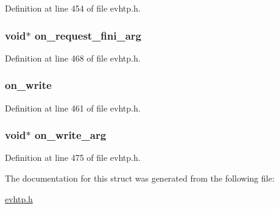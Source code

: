 \-Definition at line 454 of file evhtp.\-h.

\hypertarget{structevhtp__hooks__s_a6ff6528fe6d2018c55a718ca829e00be}{
\subsubsection[{on\-\_\-request\-\_\-fini\-\_\-arg}]{\setlength{\rightskip}{0pt plus 5cm}void$\ast$ {\bf on\-\_\-request\-\_\-fini\-\_\-arg}}}\label{structevhtp__hooks__s_a6ff6528fe6d2018c55a718ca829e00be}


\-Definition at line 468 of file evhtp.\-h.

\hypertarget{structevhtp__hooks__s_a1f9dee4096564721214ecfe05707510a}{
\subsubsection[{on\-\_\-write}]{ {\bf on\-\_\-write}}}\label{structevhtp__hooks__s_a1f9dee4096564721214ecfe05707510a}


\-Definition at line 461 of file evhtp.\-h.

\hypertarget{structevhtp__hooks__s_a9aa579b8a735219a73e5e37c390a9580}{
\subsubsection[{on\-\_\-write\-\_\-arg}]{\setlength{\rightskip}{0pt plus 5cm}void$\ast$ {\bf on\-\_\-write\-\_\-arg}}}\label{structevhtp__hooks__s_a9aa579b8a735219a73e5e37c390a9580}


\-Definition at line 475 of file evhtp.\-h.



\-The documentation for this struct was generated from the following file\-:\begin{DoxyCompactItemize}
\item 
\hyperlink{evhtp_8h}{evhtp.\-h}\end{DoxyCompactItemize}
